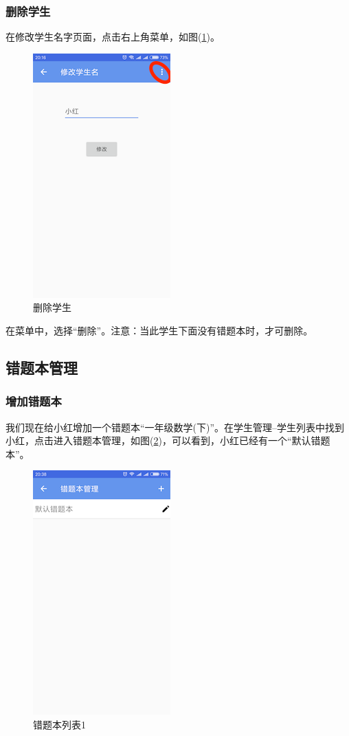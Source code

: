 \subsubsection{删除学生}
\label{delete_student}
在修改学生名字页面，点击右上角菜单，如图(\ref{img14})。
\begin{figure}[H]
	\centering
	\includegraphics{img/14.png}
	\caption{删除学生}
	\label{img14}
\end{figure}

在菜单中，选择“删除”。注意：当此学生下面没有错题本时，才可删除。

\subsection{错题本管理}
\subsubsection{增加错题本}
我们现在给小红增加一个错题本“一年级数学(下)”。在学生管理--学生列表中找到小红，点击进入错题本管理，如图(\ref{img15})，可以看到，小红已经有一个“默认错题本”。
\begin{figure}[H]
	\centering
	\includegraphics{img/15.png}
	\caption{错题本列表1}
	\label{img15}
\end{figure}

